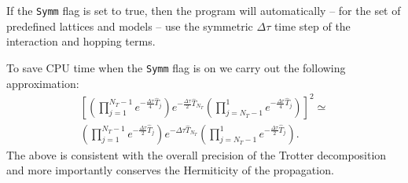 If the  \texttt{Symm}    flag is set to true,  then the program will automatically --  for the set of predefined lattices  and models -- use the symmetric   $\Delta \tau$ time step  of the interaction and 
hopping terms.

To save CPU time  when the \texttt{Symm}  flag is on  we  carry out the following   approximation:
\begin{multline}
	\left[  
	  \left(\prod_{j=1}^{N_T-1} e^{-\frac{\Delta \tau}{4} \hat{T}_j } \right)    e^{-\frac{\Delta \tau}{2} \hat{T}_{N_T} }    
   \left(  \prod_{j=N_T-1}^{1} e^{-\frac{\Delta \tau}{4} \hat{T}_j } \right)      \right]^2   \simeq \\
	   \left(\prod_{j=1}^{N_T-1} e^{-\frac{\Delta \tau}{2} \hat{T}_j } \right)    e^{-\Delta \tau\hat{T}_{N_T} }    
   \left(  \prod_{j=N_T-1}^{1} e^{-\frac{\Delta \tau}{2} \hat{T}_j } \right).   
\end{multline}
The above  is consistent with the overall precision of the Trotter decomposition and more importantly  conserves the Hermiticity of the propagation. 

